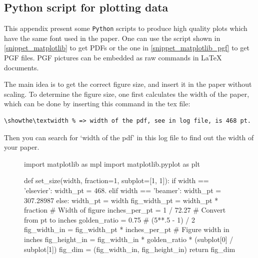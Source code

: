 \documentclass[authoryear,3p,times,preprint,review,fleqn]{elsarticle}
\numberwithin{equation}{section}
\theoremstyle{remark}
\begin{document}
\begin{appendix}
\section{Python script for plotting data}

This appendix present some \texttt{Python} scripts to produce high quality plots which have the same font used in the paper. One can use the script shown in \cref{snippet_matplotlib} to get PDFs or the one in \cref{snippet_matplotlib_pgf} to get PGF files. PGF pictures can be embedded as raw commands in LaTeX documents.

The main idea is to get the correct figure size, and insert it in the paper without scaling. To determine the figure size, one first calculates the width of the paper, which can be done by inserting this command in the tex file:


\begin{verbatim}
\showthe\textwidth % => width of the pdf, see in log file, is 468 pt. 
\end{verbatim}
Then you can search for `width of the pdf' in this log file to find out the width of your paper.

\begin{figure}[!h]
  \begin{snippet}[caption={Python script for plotting data.},label={snippet_matplotlib},framerule=1pt,tabsize=3]   
    import matplotlib as mpl
    import matplotlib.pyplot as plt

    def set_size(width, fraction=1, subplot=[1, 1]):
        if width == 'elsevier':
            width_pt = 468.
        elif width == 'beamer':
            width_pt = 307.28987
        else:
            width_pt = width
        fig_width_pt = width_pt * fraction      # Width of figure
        inches_per_pt = 1 / 72.27               # Convert from pt to inches
        golden_ratio = 0.75                     # (5**.5 - 1) / 2
        fig_width_in = fig_width_pt * inches_per_pt  # Figure width in inches
        fig_height_in = fig_width_in * golden_ratio * (subplot[0] / subplot[1])
        fig_dim = (fig_width_in, fig_height_in)
        return fig_dim


\end{snippet}
\end{figure}
\end{appendix}
\end{document}
